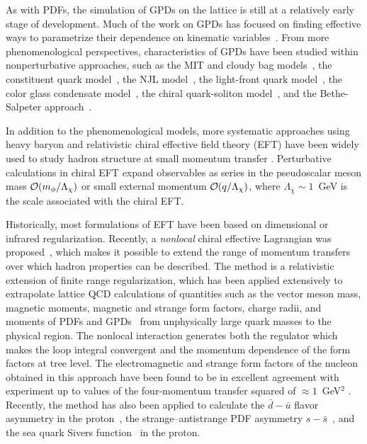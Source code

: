 \documentclass[preprintnumbers,prd,superscriptaddress,preprint]{revtex4-1}
\begin{document}
As with PDFs, the simulation of GPDs on the lattice is still at a relatively early stage of development.
Much of the work on GPDs has focused on finding effective ways to parametrize their dependence on kinematic variables~\cite{Guidal:2004nd}.
From more phenomenological perspectives, characteristics of GPDs have been studied within nonperturbative approaches, such as the MIT and cloudy bag models~\cite{Ji:1997gm, Pasquini:2006ib}, the constituent quark model~\cite{Boffi:2002yy, Scopetta:2003et}, the NJL model~\cite{Mineo:2005vs}, the light-front quark model~\cite{Choi:2001fc, Choi:2002ic}, the color glass condensate model~\cite{Goeke:2008jz}, the chiral quark-soliton model~\cite{Petrov:1998kf, Penttinen:1999th, Goeke:2001tz, Schweitzer:2002nm, Ossmann:2004bp, Wakamatsu:2005vk}, and the Bethe-Salpeter approach~\cite{Tiburzi:2001je, Theussl:2002xp}.


In addition to the phenomenological models, more systematic approaches using heavy baryon and relativistic chiral effective field theory (EFT) have been widely used to study hadron structure at small momentum transfer \cite{Fuchs:2003ir, Kubis:2000zd}.
Perturbative calculations in chiral EFT expand observables as series in the pseudoscalar meson mass ${\cal O}(m_\phi/\Lambda_{\chi})$ or small external momentum ${\cal O}(q/\Lambda_{\chi})$, where $\Lambda_{\chi} \sim 1$~GeV is the scale associated with the chiral EFT.

Historically, most formulations of EFT have been based on dimensional or infrared regularization.
Recently, a {\it nonlocal} chiral effective Lagrangian was proposed~\cite{Wang:2010rib, He:2017viu, He:2018eyz}, which makes it possible to extend the range of momentum transfers over which hadron properties can be described. 
The method is a relativistic extension of finite range regularization, which has been applied extensively to extrapolate lattice QCD calculations of quantities such as the vector meson mass, magnetic moments, magnetic and strange form factors, charge radii, and moments of PDFs and GPDs~\cite{Young:2002ib, Leinweber:2003dg, Wang:2007iw, Allton:2005fb, Wang:1900ta, Wang:2012hj, Hall:2013dva, Shanahan:2012wh, Shanahan:2014uka} from unphysically large quark masses to the physical region.
The nonlocal interaction generates both the regulator which makes the loop integral convergent and the momentum dependence of the form factors at tree level. 
The electromagnetic and strange form factors of the nucleon obtained in this approach have been found to be in excellent agreement with experiment up to values of the four-momentum transfer squared of $\approx 1$~GeV$^2$ \cite{He:2017viu, He:2018eyz}.
Recently, the method has also been applied to calculate the $\bar{d}-\bar{u}$ flavor asymmetry in the proton~\cite{Salamu:2014pka}, the strange--antistrange PDF asymmetry $s-\bar{s}$~\cite{Wang:2016eoq, Wang:2016ndh, Salamu:2018cny, Salamu:2019dok}, and the sea quark Sivers function~\cite{He:2019fzn} in the proton.
\end{document}
